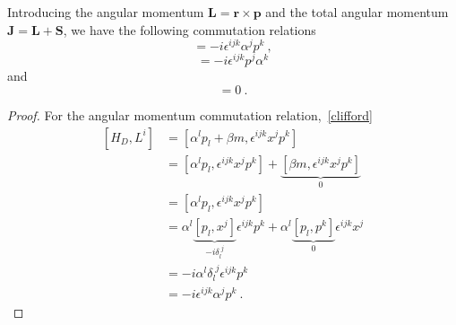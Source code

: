     Introducing the angular momentum $\mathbf L = \mathbf r \times \mathbf p$ and the total angular momentum $\mathbf J = \mathbf L + \mathbf S$, we have the following commutation relations
    \begin{equation*}
        [H_D, L^i] = - i \epsilon^{ijk} \alpha^j p^k ~,
    \end{equation*}
    \begin{equation*}
        [H_D, S^i] = - i \epsilon^{ijk} p^j \alpha^k
    \end{equation*}
    and
    \begin{equation*}
        [H_D, J^i] = 0 ~.
    \end{equation*}
    \begin{proof}
        For the angular momentum commutation relation,~\eqref{clifford}
        \begin{equation*}
        \begin{aligned}
            [H_D, L^i] & = [\alpha^l p_l + \beta m, \epsilon^{ijk} x^j p^k] \\ & = [\alpha^l p_l, \epsilon^{ijk} x^j p^k] + \underbrace{[\beta m, \epsilon^{ijk} x^j p^k]}_0 \\ & = [\alpha^l p_l, \epsilon^{ijk} x^j p^k] \\ & = \alpha^l \underbrace{[p_l,  x^j]}_{-i \delta_l^{\phantom l j}} \epsilon^{ijk} p^k + \alpha^l \underbrace{[p_l, p^k]}_0 \epsilon^{ijk} x^j \\ & = - i \alpha^l \delta_l^{\phantom l j} \epsilon^{ijk} p^k \\ & = - i \epsilon^{ijk} \alpha^j p^k ~.
        \end{aligned}
        \end{equation*}


\end{proof}
